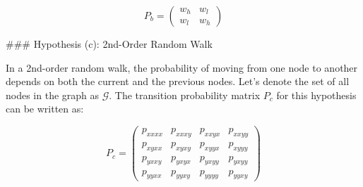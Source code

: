 \[ P_b = \begin{pmatrix}
w_h & w_l \\
w_l & w_h
\end{pmatrix} \]

### Hypothesis (c): 2nd-Order Random Walk

In a 2nd-order random walk, the probability of moving from one node to another depends on both the current and the previous nodes. Let's denote the set of all nodes in the graph as \(\mathcal{G}\). The transition probability matrix \(P_c\) for this hypothesis can be written as:

\[ P_c = \begin{pmatrix}
p_{xxxx} & p_{xxxy} & p_{xxyx} & p_{xxyy} \\
p_{xyxx} & p_{xyxy} & p_{xyyx} & p_{xyyy} \\
p_{yxxy} & p_{yxyx} & p_{yxyy} & p_{yxyy} \\
p_{yyxx} & p_{yyxy} & p_{yyyy} & p_{yyxy}
\end{pmatrix} \]

